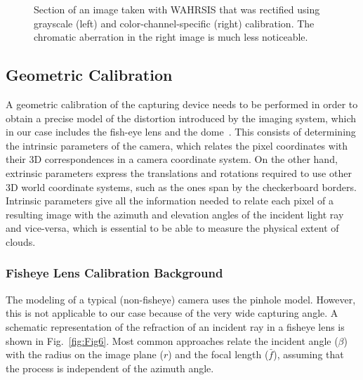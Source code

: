 \begin{figure}[htb]
\centering
{}
\quad 
{}
\caption[Illustration to show the advantages of color-channel-specific calibration as compared to grayscale calibration.]{Section of an image taken with WAHRSIS that was rectified using grayscale (left) and color-channel-specific (right) calibration. The chromatic aberration in the right image is much less noticeable.}
\label{fig:proj}
\end{figure}

\subsection{Geometric Calibration} 
\label{sec:geometrical_calib}
A geometric calibration of the capturing device needs to be performed in order to obtain a precise model of the distortion introduced by the imaging system, which in our case includes the fish-eye lens and the dome~\cite{HUOJuan}. This consists of determining the intrinsic parameters of the camera, which relates the pixel coordinates with their 3D correspondences in a camera coordinate system. On the other hand, extrinsic parameters express the translations and rotations required to use other 3D world coordinate systems, such as the ones span by the checkerboard borders. Intrinsic parameters give all the information needed to relate each pixel of a resulting image with the azimuth and elevation angles of the incident light ray and vice-versa, which is essential to be able to measure the physical extent of clouds.

\subsubsection{Fisheye Lens Calibration Background} 
\label{sec:rel_studies}
The modeling of a typical (non-fisheye) camera uses the pinhole model. However, this is not applicable to our case because of the very wide capturing angle. A schematic representation of the refraction of an incident ray in a fisheye lens is shown in Fig.~\ref{fig:Fig6}. Most common approaches relate the incident angle ($\beta$) with the radius on the image plane ($r$) and the focal length ($\bar{f}$), assuming that the process is independent of the azimuth angle.

